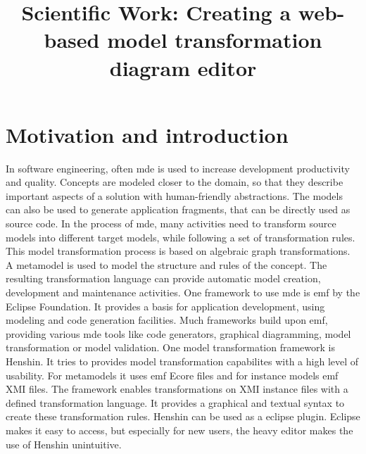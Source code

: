 \documentclass[conference,onecolumn]{IEEEtran}
\begin{document}
  \title{Scientific Work: Creating a web-based model transformation diagram editor}

  \author{
    }

  \maketitle

  \IEEEpeerreviewmaketitle

  \newpage

  \section{Motivation and introduction}
  \label{sec:motivation}

  In software engineering, often \ac{mde} is used to increase development productivity and quality. Concepts are modeled closer to the domain, so that they describe important aspects of a solution with human-friendly abstractions. The models can also be used to generate application fragments, that can be directly used as source code. In the process of \ac{mde}, many activities need to transform source models into different target models, while following a set of transformation rules. This model transformation process is based on algebraic graph transformations. A metamodel is used to model the structure and rules of the concept. The resulting transformation language can provide automatic model creation, development and maintenance activities. \cite{transformations-modeldriven} One framework to use \ac{mde} is \ac{emf} by the Eclipse Foundation. It provides a basis for application development, using modeling and code generation facilities. Much frameworks build upon \ac{emf}, providing various \ac{mde} tools like code generators, graphical diagramming, model transformation or model validation. \cite{emf} One model transformation framework is Henshin. \cite{henshin-repo} It tries to provides model transformation capabilites with a high level of usability. \cite{henshin-usability} For metamodels it uses \ac{emf} Ecore files and for instance models \ac{emf} XMI files. The framework enables transformations on XMI instance files with a defined transformation language. It provides a graphical and textual syntax to create these transformation rules. \cite{henshin-repo} Henshin can be used as a eclipse plugin. Eclipse makes it easy to access, but especially for new users, the heavy editor makes the use of Henshin unintuitive.
\end{document}
